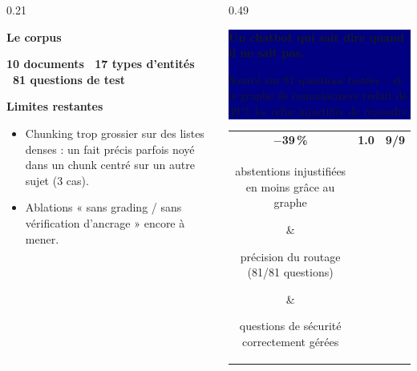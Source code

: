 \documentclass[final]{beamer}
\newcommand{\sectsm}[1]{%
  \par\vspace{0.42cm}
  {\color{navy}\fontsize{52}{58}\selectfont\bfseries #1\par}
  \vspace{0.22cm}{\color{navy}\hrule height 2pt}\vspace{0.38cm}}
\begin{document}
\begin{frame}[t]
\begin{columns}[t,totalwidth=0.95\paperwidth]
\begin{column}{0.21\paperwidth}
{{\sectsm{Le corpus}
\centering\color{navy}\bfseries\Large 10 documents \textperiodcentered\ 17 types d'entit\'es \textperiodcentered\ 81 questions de test\par
\vspace{0.4cm}\justifying

\sectsm{Limites restantes}
\large
\begin{itemize}
  \item Chunking trop grossier sur des listes denses : un fait pr\'ecis parfois noy\'e dans un chunk centr\'e sur un autre sujet (3 cas).
  \vspace{0.15cm}
  \item Ablations « sans grading / sans v\'erification d'ancrage » encore \`a mener.
\end{itemize}
\vspace{0.3cm}}}
\end{column}

\hspace{0.015\paperwidth}

\begin{column}{0.49\paperwidth}

\colorbox{navy}{\parbox[t]{\dimexpr\linewidth-2\fboxsep}{\centering\vspace{1.3cm}
{\color{white}\fontsize{112}{122}\selectfont\bfseries Un chatbot qui sait dire quand il ne sait pas.\par}
\vspace{0.7cm}
{\color{pale}\fontsize{54}{62}\selectfont Sourc\'e sur 81 questions test\'ees -- et le graphe de connaissances r\'eduit de 39\,\% les refus injustifi\'es de r\'epondre.\par}
\vspace{1.3cm}}}

\vspace{0.9cm}
\centering
\begin{tabular}{ccc}
{\color{navy}\fontsize{92}{100}\selectfont\bfseries $-$39\,\%} & {\color{navy}\fontsize{92}{100}\selectfont\bfseries 1.0} & {\color{navy}\fontsize{92}{100}\selectfont\bfseries 9/9} \\[0.3cm]
\parbox{0.28\linewidth}{\centering\large abstentions injustifi\'ees en moins gr\^ace au graphe} &
\parbox{0.28\linewidth}{\centering\large pr\'ecision du routage (81/81 questions)} &
\parbox{0.28\linewidth}{\centering\large questions de s\'ecurit\'e correctement g\'er\'ees}
\end{tabular}


\end{column}
\end{columns}
\end{frame}
\end{document}

